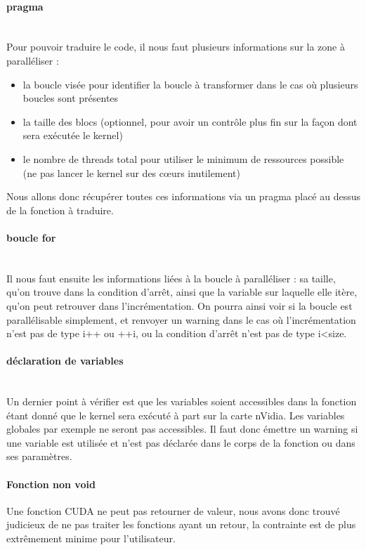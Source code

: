 \documentclass{article}
\begin{document}
	\paragraph{pragma}
	~~\\
	\indent
	Pour pouvoir traduire le code, il nous faut plusieurs informations sur la zone à paralléliser : 
	\begin{itemize}
		\item la boucle visée pour identifier la boucle à transformer dans le cas où plusieurs boucles sont présentes
		\item la taille des blocs (optionnel, pour avoir un contrôle plus fin sur la façon dont sera exécutée le kernel)
		\item le nombre de threads total pour utiliser le minimum de ressources possible (ne pas lancer le kernel sur des cœurs inutilement)
	\end{itemize}		
	Nous allons donc récupérer toutes ces informations via un pragma placé au dessus de la fonction à traduire.
	
	\paragraph{boucle for}
	~~\\
	\indent
	Il nous faut ensuite les informations liées à la boucle à paralléliser : sa taille, qu'on trouve dans la condition d'arrêt, ainsi que la variable sur laquelle elle itère, qu'on peut retrouver dans l'incrémentation. On pourra ainsi voir si la boucle est parallélisable simplement, et renvoyer un warning dans le cas où l'incrémentation n'est pas de type i++ ou ++i, ou la condition d'arrêt n'est pas de type i\textless size.	
	
	\paragraph{déclaration de variables}
	~~\\
	\indent
	Un dernier point à vérifier est que les variables soient accessibles dans la fonction étant donné que le kernel sera exécuté à part sur la carte nVidia. Les variables globales par exemple ne seront pas accessibles. Il faut donc émettre un warning si une variable est utilisée et n'est pas déclarée dans le corps de la fonction ou dans ses paramètres.
	
	\paragraph{Fonction non void}
	Une fonction CUDA ne peut pas retourner de valeur, nous avons donc trouvé judicieux de ne pas traiter les fonctions ayant un retour, la contrainte est de plus extrêmement minime pour l'utilisateur.
	
\end{document}
